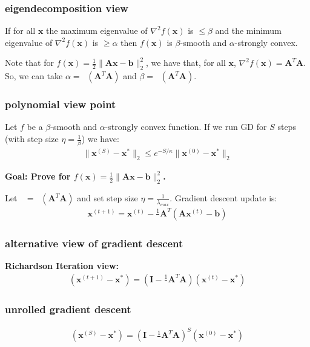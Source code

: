 \documentclass[compress]{beamer}
\newcommand{\bv}[1]{\mathbf{#1}}
\DeclareMathOperator*{\lmin}{\lambda_{min}}
\DeclareMathOperator*{\lmax}{\lambda_{max}}
\begin{document}
\begin{frame}[t]
	\frametitle{eigendecomposition view}
	If for all $\bv{x}$ the maximum eigenvalue of $\nabla^2f(\bv{x})$ is $\leq \beta$ and the minimum eigenvalue of $\nabla^2f(\bv{x})$ is $\geq \alpha$ then $f(\bv{x})$ is $\beta$-smooth and $\alpha$-strongly convex.
	\vspace{4em}

	Note that for $f(\bv{x}) = \frac{1}{2}\|\bv{A}\bv{x} - \bv{b}\|_2^2$, we have that, for all $\bv{x}$, $\nabla^2f(\bv{x}) = \bv{A}^T\bv{A}$. So, we can take $\alpha = \lmin(\bv{A}^T\bv{A})$ and $\beta = \lmax(\bv{A}^T\bv{A})$.
\end{frame}

\begin{frame}[t]
	\frametitle{polynomial view point}
	\begin{theorem}
		Let $f$ be a $\beta$-smooth and $\alpha$-strongly convex function. If we run GD for $S$ steps (with step size $\eta = \frac{1}{\beta}$) we have:
		\begin{align*}
			\|\bv{x}^{(S)} - \bv{x}^*\|_2 \leq e^{-S/\kappa} \|\bv{x}^{(0)} - \bv{x}^*\|_2
		\end{align*} 
	\end{theorem}
	
	\begin{center}
		\alert{\textbf{Goal: Prove for $f(\bv{x}) = \frac{1}{2}\|\bv{A}\bv{x} - \bv{b}\|_2^2$.}}
	\end{center}	
	Let $\lmax = \lmax(\bv{A}^T\bv{A})$ and set step size $\eta = \frac{1}{\lambda_{max}}$. Gradient descent update is:
	\begin{align*}
		\bv{x}^{(t+1)} = \bv{x}^{(t)} - \frac{1}{\lmax}\bv{A}^T(\bv{A}\bv{x}^{(t)} - \bv{b})
	\end{align*}
	
\end{frame}

\begin{frame}[t]
	\frametitle{alternative view of gradient descent}
	\textbf{Richardson Iteration view:}
	\begin{align*}
		(\bv{x}^{(t+1)} - \bv{x}^*) =  \left(\bv{I} - \frac{1}{\lmax}\bv{A}^T\bv{A}\right)(\bv{x}^{(t)} - \bv{x}^*) 
	\end{align*}
	


\end{frame}

\begin{frame}[t]
	\frametitle{unrolled gradient descent}
	\begin{align*}
		(\bv{x}^{(S)} - \bv{x}^*) =  \left(\bv{I} - \frac{1}{\lmax}\bv{A}^T\bv{A}\right)^S(\bv{x}^{(0)} - \bv{x}^*) 
	\end{align*}
	

\end{frame}
\end{document}
